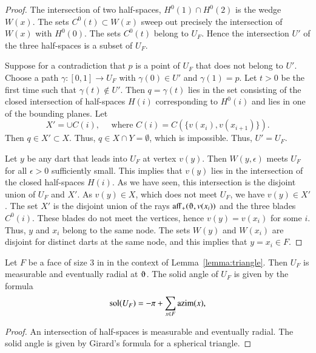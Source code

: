 \begin{proof} The intersection of two half-spaces, $H^0(1)\cap H^0(2)$ is
the wedge $W(x)$.   The sets $C^0(t)\subset W(x)$ sweep out precisely
the intersection of $W(x)$ with $H^0(0)$.  The sets $C^0(t)$ belong to
$U_F$.  Hence the intersection $U'$ of the three half-spaces is a subset of $U_F$.

Suppose for a contradiction 
that $p$ is a point of $U_F$ that does not belong to $U'$.  Choose a path $\gamma:[0,1]\to U_F$ with $\gamma(0)\in U'$ and $\gamma(1)=p$.  Let $t>0$ be the first time such that $\gamma(t)\not\in U'$.  Then $q=\gamma(t)$ lies in the set consisting of the closed intersection of half-spaces $H(i)$ corresponding to $H^0(i)$ and lies
in one of the bounding planes.  Let 
$$
X' = \cup C(i),\quad\text{ where } C(i)=C(\{v(x_i),v(x_{i+1})\}).
$$
Then $q\in X'\subset X$.  Thus,
$q\in X\cap Y = \emptyset$, which is impossible.  Thus, $U'=U_F$.

Let $y$ be any dart that leads into $U_F$ at vertex $v(y)$.  Then
$W(y,\epsilon)$ meets $U_F$ for all $\epsilon>0$ sufficiently small.
This implies that $v(y)$ lies in the intersection of the closed half-spaces $H(i)$.  As we have seen, this intersection is the disjoint union of $U_F$ and
$X'$.  As $v(y)\in X$, which does not meet $U_F$, we have $v(y)\in X'$.
The set $X'$ is the disjoint union of the rays $\op{aff}_+(\orgn,v(x_i))$ and
the three blades $C^0(i)$.  These blades do not meet the vertices, hence
$v(y)=v(x_i)$ for some $i$.  Thus, $y$ and $x_i$ belong to the same
node.  The sets $W(y)$ and $W( x_i)$ are disjoint for distinct darts at the same
node, and this implies that $y=x_i\in F$.
\end{proof}

\begin{corollary}\label{lemma:girard-component}
Let $F$ be a face of size $3$ in in the context of Lemma~\ref{lemma:triangle}.  Then $U_F$ is measurable and eventually radial at $\orgn$.
The solid angle of $U_F$ is given by the formula
$$
\operatorname{sol}(U_F) = -\pi + \sum_{x\in F}{\operatorname{azim}}(x),
$$
\end{corollary}

\begin{proof} An intersection of half-spaces is measurable and
eventually radial.  The solid angle is given by Girard's formula for
a spherical triangle.
\end{proof}

